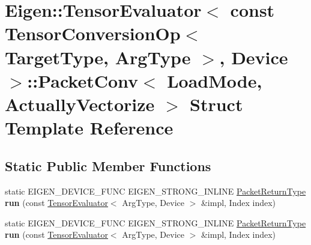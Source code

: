 \hypertarget{struct_eigen_1_1_tensor_evaluator_3_01const_01_tensor_conversion_op_3_01_target_type_00_01_arg_t3168668fdfbeba0eb2459f9b9de77bc7}{}\section{Eigen\+:\+:Tensor\+Evaluator$<$ const Tensor\+Conversion\+Op$<$ Target\+Type, Arg\+Type $>$, Device $>$\+:\+:Packet\+Conv$<$ Load\+Mode, Actually\+Vectorize $>$ Struct Template Reference}
\label{struct_eigen_1_1_tensor_evaluator_3_01const_01_tensor_conversion_op_3_01_target_type_00_01_arg_t3168668fdfbeba0eb2459f9b9de77bc7}
\subsection*{Static Public Member Functions}
\begin{DoxyCompactItemize}
\item 
\mbox{\label{struct_eigen_1_1_tensor_evaluator_3_01const_01_tensor_conversion_op_3_01_target_type_00_01_arg_t3168668fdfbeba0eb2459f9b9de77bc7_a62f64d8360f6c38855d2388e81ac54ad}} 
static E\+I\+G\+E\+N\+\_\+\+D\+E\+V\+I\+C\+E\+\_\+\+F\+U\+NC E\+I\+G\+E\+N\+\_\+\+S\+T\+R\+O\+N\+G\+\_\+\+I\+N\+L\+I\+NE \hyperlink{group___sparse_core___module}{Packet\+Return\+Type} {\bfseries run} (const \hyperlink{struct_eigen_1_1_tensor_evaluator}{Tensor\+Evaluator}$<$ Arg\+Type, Device $>$ \&impl, Index index)
\item 
\mbox{\label{struct_eigen_1_1_tensor_evaluator_3_01const_01_tensor_conversion_op_3_01_target_type_00_01_arg_t3168668fdfbeba0eb2459f9b9de77bc7_a62f64d8360f6c38855d2388e81ac54ad}} 
static E\+I\+G\+E\+N\+\_\+\+D\+E\+V\+I\+C\+E\+\_\+\+F\+U\+NC E\+I\+G\+E\+N\+\_\+\+S\+T\+R\+O\+N\+G\+\_\+\+I\+N\+L\+I\+NE \hyperlink{group___sparse_core___module}{Packet\+Return\+Type} {\bfseries run} (const \hyperlink{struct_eigen_1_1_tensor_evaluator}{Tensor\+Evaluator}$<$ Arg\+Type, Device $>$ \&impl, Index index)
\end{DoxyCompactItemize}


